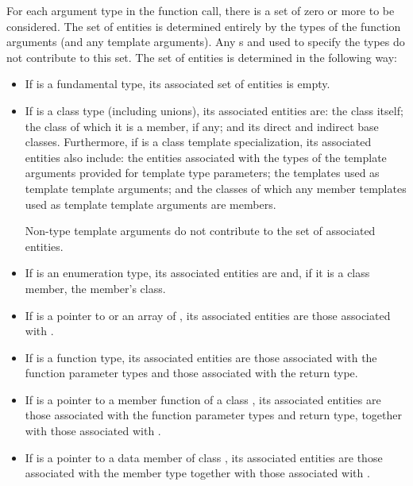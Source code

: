 \documentclass{wg21}
\begin{document}
\pnum
For each argument type  in the function call,
there is a set of zero or more 
to be considered.
The set of entities is determined entirely by
the types of the function arguments
(and any  template arguments).
Any s and 
used to specify the types
do not contribute to this set.
The set of entities
is determined in the following way:
\begin{itemize}
    \item If  is a fundamental type, its associated set of
    entities is empty.

    \item If  is a class type (including unions),
    its associated entities are:
    the class itself;
    the class of which it is a member, if any;
    and its direct and indirect base classes.
    Furthermore, if  is a class template specialization,
    its associated entities also include:
    the entities
    associated with the types of the template arguments
    provided for template type parameters;
    the templates used as template template arguments; and
    the classes of which any member templates used as template template
    arguments are members.
    \begin{note}
        Non-type template arguments do not
        contribute to the set of associated entities.
    \end{note}

    \item If  is an enumeration type,
    its associated entities are 
    and, if it is a class member, the member's class.

    \item If  is a pointer to  or an array of ,
    its associated entities are those associated with .

    \item If  is a function type, its associated
    entities are those associated with the function parameter types and those
    associated with the return type.

    \item If  is a pointer to a member function of a class
    , its associated entities are those associated
    with the function parameter types and return type, together with those
    associated with .

    \item If  is a pointer to a data member of class , its
    associated entities are those associated with the member
    type together with those associated with .
\end{itemize}
\end{document}
